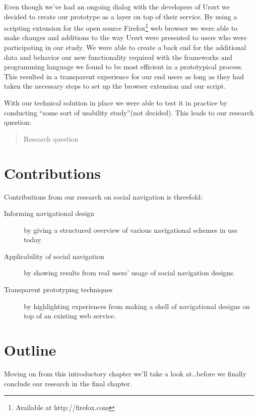 Even though we've had an ongoing dialog with the developers of Ur\o{}rt we
decided to create our prototype as a layer on top of their service. By using a
scripting extension for the open source
Firefox\footnote{Available at http://firefox.com}
web browser we were able to make changes and additions to the way Ur\o{}rt were
presented to users who were participating in our study. We were able to create
a back end for the additional data and behavior our new functionality required
with the frameworks and programming language we found to be most efficient in
a prototypical process. This resulted in a transparent experience for our end
users as long as they had taken the necessary steps to set up the browser
extension and our script.

With our technical solution in place we were able to test it in practice by
conducting ``some sort of usability study''(not decided). This leads to our
research question:


\begin{quote}
  Research question
\end{quote}

\section{Contributions}

Contributions from our research on social navigation is threefold:

\begin{description}
  \item[Informing navigational design] by giving a structured overview of
    various navigational schemes in use today.
  \item[Applicability of social navigation] by showing results from real
    users' usage of social navigation designs.
  \item[Transparent prototyping techniques] by highlighting experiences from
    making a shell of navigational designs on top of an existing web service.
\end{description}

\section{Outline}

Moving on from this introductory chapter we'll take a look at\ldots before we
finally conclude our research in the final chapter.

